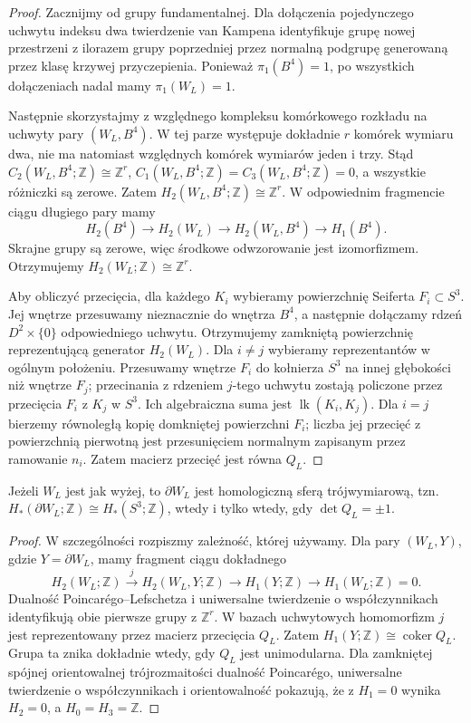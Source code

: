 \begin{proof}
Zacznijmy od grupy fundamentalnej. Dla dołączenia
pojedynczego uchwytu indeksu dwa twierdzenie van Kampena
identyfikuje grupę nowej przestrzeni z ilorazem grupy
poprzedniej przez normalną podgrupę generowaną przez
klasę krzywej przyczepienia. Ponieważ $\pi_1(B^4)=1$,
po wszystkich dołączeniach nadal mamy $\pi_1(W_L)=1$.

Następnie skorzystajmy z względnego kompleksu komórkowego
rozkładu na uchwyty pary $(W_L,B^4)$.
W tej parze występuje dokładnie $r$ komórek wymiaru dwa,
nie ma natomiast względnych komórek wymiarów jeden i trzy.
Stąd
$C_2(W_L,B^4;\mathbb Z)\cong\mathbb Z^r$,
$C_1(W_L,B^4;\mathbb Z)=C_3(W_L,B^4;\mathbb Z)=0$,
a wszystkie różniczki są zerowe. Zatem
$H_2(W_L,B^4;\mathbb Z)\cong\mathbb Z^r$.
W odpowiednim fragmencie ciągu długiego pary mamy
\[
H_2(B^4)\longrightarrow H_2(W_L)
\longrightarrow H_2(W_L,B^4)
\longrightarrow H_1(B^4).
\]
Skrajne grupy są zerowe, więc środkowe odwzorowanie
jest izomorfizmem. Otrzymujemy
$H_2(W_L;\mathbb Z)\cong\mathbb Z^r$.

Aby obliczyć przecięcia, dla każdego $K_i$ wybieramy
powierzchnię Seiferta $F_i\subset S^3$. Jej wnętrze
przesuwamy nieznacznie do wnętrza $B^4$, a następnie
dołączamy rdzeń $D^2\times\{0\}$ odpowiedniego uchwytu.
Otrzymujemy zamkniętą powierzchnię reprezentującą generator
$H_2(W_L)$. Dla $i\ne j$ wybieramy reprezentantów w ogólnym położeniu.
Przesuwamy wnętrze $F_i$ do kołnierza $S^3$ na innej
głębokości niż wnętrze $F_j$; przecinania z rdzeniem
$j$-tego uchwytu zostają policzone przez przecięcia
$F_i$ z $K_j$ w $S^3$. Ich algebraiczna suma jest
$\operatorname{lk}(K_i,K_j)$. Dla $i=j$ bierzemy
równoległą kopię domkniętej powierzchni $F_i$; liczba
jej przecięć z powierzchnią pierwotną jest przesunięciem
normalnym zapisanym przez ramowanie $n_i$. Zatem macierz przecięć jest równa $Q_L$.
\end{proof}

\begin{wniosek}
Jeżeli $W_L$ jest jak wyżej, to $\partial W_L$ jest
homologiczną sferą trójwymiarową, tzn.
$H_*(\partial W_L;\mathbb Z)\cong H_*(S^3;\mathbb Z)$,
wtedy i tylko wtedy, gdy $\det Q_L=\pm1$.
\end{wniosek}

\begin{proof}
W szczególności rozpiszmy zależność, której używamy.
Dla pary $(W_L,Y)$, gdzie $Y=\partial W_L$, mamy
fragment ciągu dokładnego
\[
H_2(W_L;\mathbb Z)\xrightarrow{j}
H_2(W_L,Y;\mathbb Z)\longrightarrow
H_1(Y;\mathbb Z)\longrightarrow H_1(W_L;\mathbb Z)=0.
\]
Dualność Poincarégo--Lefschetza i uniwersalne twierdzenie
o współczynnikach identyfikują obie pierwsze grupy z
$\mathbb Z^r$. W bazach uchwytowych homomorfizm $j$
jest reprezentowany przez macierz przecięcia $Q_L$.
Zatem $H_1(Y;\mathbb Z)\cong\operatorname{coker}Q_L$.
Grupa ta znika dokładnie wtedy, gdy $Q_L$ jest unimodularna. Dla zamkniętej spójnej orientowalnej
trójrozmaitości dualność Poincarégo, uniwersalne twierdzenie
o współczynnikach i orientowalność pokazują, że z
$H_1=0$ wynika $H_2=0$, a $H_0=H_3=\mathbb Z$.
\end{proof}

